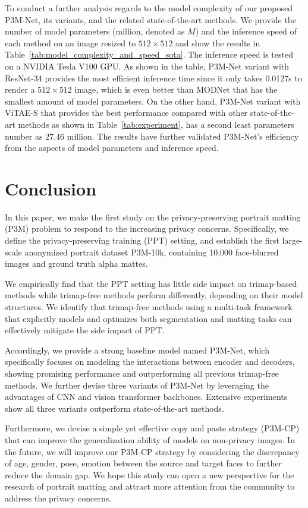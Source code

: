 \documentclass[twocolumn]{svjour3}
\begin{document}
To conduct a further analysis regards to the model complexity of our proposed P3M-Net, its variants, and the related state-of-the-art methods. We provide the number of model parameters (million, denoted as $M$) and the inference speed of each method on an image resized to $512\times512$ and show the results in Table~\ref{tab:model_complexity_and_speed_sota}. The inference speed is tested on a NVIDIA Tesla V100 GPU. As shown in the table, P3M-Net variant with ResNet-34 provides the most efficient inference time since it only takes 0.0127s to render a $512\times512$ image, which is even better than MODNet that has the smallest amount of model parameters. On the other hand, P3M-Net variant with ViTAE-S that provides the best performance compared with other state-of-the-art methods as shown in Table~\ref{tab:experiment}, has a second least parameters number as 27.46 million. The results have further validated P3M-Net's efficiency from the aspects of model parameters and inference speed. 





\section{Conclusion}\label{sec:conclusion}

In this paper, we make the first study on the privacy-preserving portrait matting (P3M) problem to respond to the increasing privacy concerns. Specifically, we define the privacy-preserving training (PPT) setting, and establish the first large-scale anonymized portrait dataset P3M-10k, containing 10,000 face-blurred images and ground truth alpha mattes. 

We empirically find that the PPT setting has little side impact on trimap-based methods while trimap-free methods perform differently, depending on their model structures. We identify that trimap-free methods using a multi-task framework that explicitly models and optimizes both segmentation and matting tasks can effectively mitigate the side impact of PPT. 

Accordingly, we provide a strong baseline model named P3M-Net, which specifically focuses on modeling the interactions between encoder and decoders, showing promising performance and outperforming all previous trimap-free methods. We further devise three variants of P3M-Net by leveraging the advantages of CNN and vision transformer backbones. Extensive experiments show all three variants outperform state-of-the-art methods. 

Furthermore, we devise a simple yet effective copy and paste strategy (P3M-CP) that can improve the generalization ability of models on non-privacy images. In the future, we will improve our P3M-CP strategy by considering the discrepancy of age, gender, pose, emotion between the source and target faces to further reduce the domain gap. We hope this study can open a new perspective for the research of portrait matting and attract more attention from the community to address the privacy concerns. 

      

\end{document}
